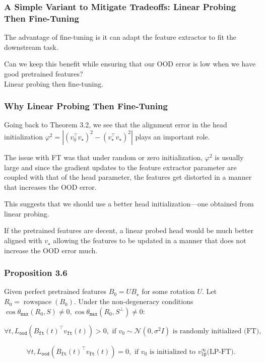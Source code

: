 \documentclass[16pt,aspectratio=169]{beamer}
\begin{document}
\begin{frame}
    \frametitle{A Simple Variant to Mitigate Tradeoffs: Linear Probing Then Fine-Tuning}

    The advantage of fine-tuning is it can adapt the feature extractor to fit the downstream task. 

    Can we keep this benefit while ensuring that our OOD error is low when we have good pretrained features?\\
    {\color{blue}Linear probing then fine-tuning.}

\end{frame}

\begin{frame}
    \frametitle{Why Linear Probing Then Fine-Tuning}

    Going back to Theorem 3.2, we see that the alignment error in the head initialization $\varphi^2=\left|\left(v_0^{\top} v_{\star}\right)^2-\left(v_{\star}^{\top} v_{\star}\right)^2\right|$ plays an important role. 
    
    The issue with FT was that under random or zero initialization, $\varphi^2$ is usually large and since the gradient updates to the feature extractor parameter are coupled with that of the head parameter, the features get distorted in a manner that increases the OOD error. 
    
    This suggests that {\color{blue}we should use a better head initialization}---one obtained from linear probing. 
    
    If the pretrained features are decent, a linear probed head would be much better aligned with $v_{\star}$ allowing the features to be updated in a manner that does not increase the OOD error much.

\end{frame}

\begin{frame}
    \frametitle{Proposition 3.6}

    Given perfect pretrained features $B_0=U B_{\star}$ for some rotation $U$. 
    Let $R_0= \operatorname{rowspace} \left(B_0\right)$. 
    Under the non-degeneracy conditions $\cos \theta_{\mathtt{max}}\left(R_0, S\right) \neq 0, \cos \theta_{\mathtt{max}}\left(R_0, S^{\perp}\right) \neq 0$:

    \begin{equation}
        \forall t, L_{\mathtt{ood}}\left(B_{\mathtt{ft}}(t)^{\top} v_{\mathtt{ft}}(t)\right)>0, \text { if } v_0 \sim \mathcal{N}\left(0, \sigma^2 I\right) \text { is randomly initialized (FT)},
    \end{equation}

    \begin{equation}
        \forall t, L_{\mathtt{ood}}\left(B_{\mathtt{ft}}(t)^{\top} v_{\mathtt{ft}}(t)\right)=0, \text { if } v_0 \text { is initialized to } v_{\mathtt{lp}}^{\infty} \text{(LP-FT)}.
    \end{equation}

\end{frame}
\end{document}
